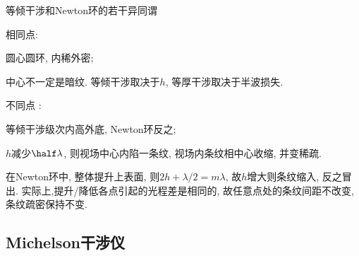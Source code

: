 \documentclass{ctexart}
\begin{document}

\par
等倾干涉和Newton环的若干异同谓
\begin{cenum}
    \item 相同点:
    \begin{cenum}
        \item 圆心圆环, 内稀外密;
        \item 中心不一定是暗纹. 等倾干涉取决于$h$, 等厚干涉取决于半波损失.
    \end{cenum}
    \item 不同点 :
    \begin{cenum}
        \item 等倾干涉级次内高外底, Newton环反之;
        \item $h$减少$\displaystyle \half\lambda$, 则视场中心内陷一条纹, 视场内条纹相中心收缩, 并变稀疏.
        \item 在Newton环中, 整体提升上表面, 则$2h + \lambda/2 = m\lambda$, 故$h$增大则条纹缩入, 反之冒出. 实际上,提升/降低各点引起的光程差是相同的, 故任意点处的条纹间距不改变, 条纹疏密保持不变.
    \end{cenum}
\end{cenum}


\subsection{Michelson干涉仪} %
\label{sub:michelson干涉仪}
\end{document}
